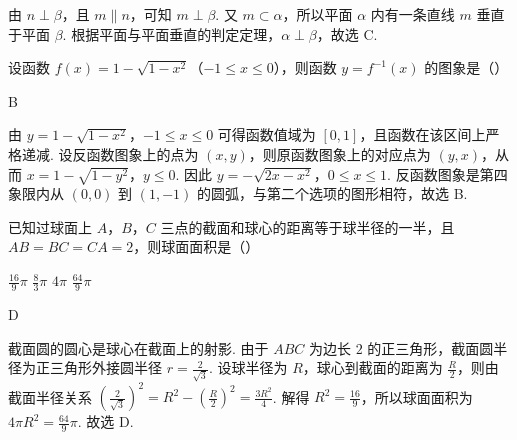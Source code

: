 \begin{solution}
由 \(n\perp\beta\)，且 \(m\parallel n\)，可知 \(m\perp\beta\). 又 \(m\subset\alpha\)，所以平面 \(\alpha\) 内有一条直线 \(m\) 垂直于平面 \(\beta\). 根据平面与平面垂直的判定定理，\(\alpha\perp\beta\)，故选 C.
\end{solution}

\begin{problem}
设函数 \(f(x) = 1 - \sqrt{1 - x^2}\)（\(-1 \leqslant x \leqslant 0\)），则函数 \(y = f^{-1}(x) \) 的图象是（\quad）

    {}
    {}
    {}
\end{problem}

\begin{answer}
B
\end{answer}

\begin{solution}
由 \(y=1-\sqrt{1-x^2}\)，\(-1\leqslant x\leqslant0\) 可得函数值域为 \([0,1]\)，且函数在该区间上严格递减. 设反函数图象上的点为 \((x,y)\)，则原函数图象上的对应点为 \((y,x)\)，从而 \(x=1-\sqrt{1-y^2}\)，\(y\leqslant0\). 因此 \(y=-\sqrt{2x-x^2}\)，\(0\leqslant x\leqslant1\).
反函数图象是第四象限内从 \((0,0)\) 到 \((1,-1)\) 的圆弧，与第二个选项的图形相符，故选 B.
\end{solution}

\begin{problem}
已知过球面上 \(A\)，\(B\)，\(C\) 三点的截面和球心的距离等于球半径的一半，且 \(AB = BC = CA = 2 \)，则球面面积是（\quad）

\choices
    {\(\frac{16}{9}\pi\)}
    {\(\frac{8}{3}\pi\)}
    {\(4\pi\)}
    {\(\frac{64}{9}\pi\)}
\end{problem}

\begin{answer}
D
\end{answer}

\begin{solution}
截面圆的圆心是球心在截面上的射影. 由于 \(ABC\) 为边长 \(2\) 的正三角形，截面圆半径为正三角形外接圆半径 \(r=\frac{2}{\sqrt{3}}\). 设球半径为 \(R\)，球心到截面的距离为 \(\frac{R}{2}\)，则由截面半径关系 \(\left(\frac{2}{\sqrt{3}}\right)^2=R^2-\left(\frac{R}{2}\right)^2=\frac{3R^2}{4}\). 解得 \(R^2=\frac{16}{9}\)，所以球面面积为 \(4\pi R^2=\frac{64}{9}\pi\).
故选 D.
\end{solution}

